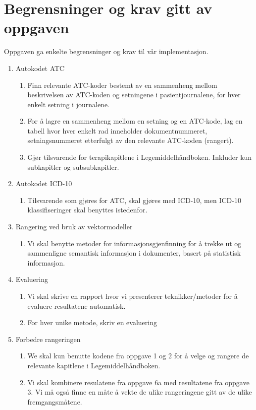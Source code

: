 \section{Begrensninger og krav gitt av oppgaven}

Oppgaven ga enkelte begrensninger og krav til vår implementasjon.
\begin{enumerate}
\item{Autokodet ATC}
\begin{enumerate}
\item{Finn relevante ATC-koder bestemt av en sammenheng mellom beskrivelsen av ATC-koden og setningene i pasientjournalene, for hver enkelt setning i journalene.}
\item{For å lagre en sammenheng mellom en setning og en ATC-kode, lag en tabell hvor hver enkelt rad inneholder dokumentnummeret, setningsnummeret etterfulgt av den relevante ATC-koden (rangert).}
\item{Gjør tilsvarende for terapikapitlene i Legemiddelhåndboken. Inkluder kun subkapitler og subsubkapitler.}
\end{enumerate}
\item{Autokodet ICD-10}
\begin{enumerate}
\item{Tilsvarende som gjøres for ATC, skal gjøres med ICD-10, men ICD-10 klassifiseringer skal benyttes istedenfor.}
\end{enumerate}
\item{Rangering ved bruk av vektormodeller}
\begin{enumerate}
\item{Vi skal benytte metoder for informasjonsgjenfinning for å trekke ut og sammenligne semantisk informasjon i dokumenter, basert på statistisk informasjon.}
\end{enumerate}
\item{Evaluering}
\begin{enumerate}
\item{Vi skal skrive en rapport hvor vi presenterer teknikker/metoder for å evaluere resultatene automatisk.}
\item{For hver unike metode, skriv en evaluering}
\end{enumerate}
\item{Forbedre rangeringen}
\begin{enumerate}
\item{We skal kun benutte kodene fra oppgave 1 og 2 for å velge og rangere de relevante kapitlene i Legemiddelhåndboken.}
\item{Vi skal kombinere resulatene fra oppgave 6a med resultatene fra oppgave 3. Vi må også finne en måte å vekte de ulike rangeringene gitt av de ulike fremgangsmåtene.}

\end{enumerate}
\end{enumerate}
